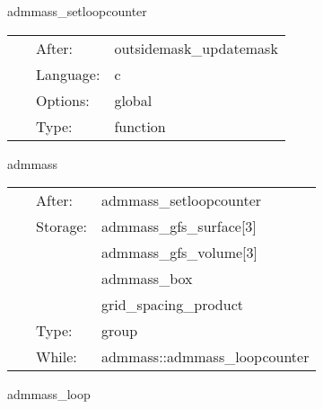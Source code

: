 \vspace{5mm}


\hspace{5mm} admmass\_setloopcounter 

\hspace{5mm}{\it set the loop counter to the value of the parameter admmass:admmass\_number } 


\hspace{5mm}

 \begin{tabular*}{160mm}{cll} 
~ & After:  & outsidemask\_updatemask \\ 
~ & Language:  & c \\ 
~ & Options:  & global \\ 
~ & Type:  & function \\ 
\end{tabular*} 


\vspace{5mm}


\hspace{5mm} admmass 

\hspace{5mm}{\it admmass loop } 


\hspace{5mm}

 \begin{tabular*}{160mm}{cll} 
~ & After:  & admmass\_setloopcounter \\ 
~ & Storage:  & admmass\_gfs\_surface[3] \\ 
~& ~ &admmass\_gfs\_volume[3]\\ 
~& ~ &admmass\_box\\ 
~& ~ &grid\_spacing\_product\\ 
~ & Type:  & group \\ 
~ & While:  & admmass::admmass\_loopcounter \\ 
\end{tabular*} 


\vspace{5mm}


\hspace{5mm} admmass\_loop 

\hspace{5mm}{\it decrement loop counter } 


\hspace{5mm}

